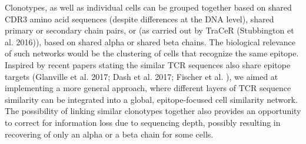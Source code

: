 \documentclass[8pt]{article}
\begin{document}
Clonotypes, as well as individual cells can be grouped together based on shared CDR3 amino acid sequences (despite differences at the DNA level), shared primary or secondary chain pairs, or (as carried out by TraCeR (Stubbington et al. 2016)), based on shared alpha or shared beta chains. The biological relevance of such networks would be the clustering of cells that recognize the same epitope. Inspired by recent papers stating the similar TCR sequences also share epitope targets (Glanville et al. 2017; Dash et al. 2017; Fischer et al. ), we aimed at implementing a more general approach, where different layers of TCR sequence similarity can be integrated into a global, epitope-focused cell similarity network. The possibility of linking similar clonotypes together also provides an opportunity to correct for information loss due to sequencing depth, possibly resulting in recovering of only an alpha or a beta chain for some cells. \par
\end{document}
